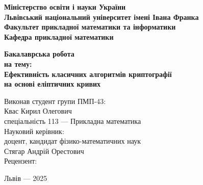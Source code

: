 \documentclass[12pt]{report}
\theoremstyle{definition}
\theoremstyle{plain}
\begin{document}
\begin{titlepage}
    \begin{center}
        \large 
        \textbf{Міністерство освіти і науки України}\\
        \textbf{Львівський національний університет імені Івана Франка}\\
        \vspace{0.5cm}
        \textbf{Факультет прикладної математики та інформатики}\\
        \textbf{Кафедра прикладної математики}\\
        
        \vfill
        
        \Large 
        \textbf{Бакалаврська робота}\\
        \vspace{0.3cm}
        \normalsize 
        \textbf{на тему:}\\
        \vspace{0.3cm}
        \Large 
        \textbf{Ефективність класичних алгоритмів криптографії \\ на основі еліптичних кривих}\\
        
        \vfill
        
        \begin{flushright}
            \normalsize 
            Виконав студент групи ПМП-43:\\
            Квас Кирил Олегович\\
            спеціальність 113 — Прикладна математика\\
            \vspace{1cm}
            Науковий керівник:\\
            доцент, кандидат фізико-математичних наук\\
            Стягар Андрій Орестович \\
            \vspace{1cm}
            Рецензент:\\
            \vspace{0.5cm}
            \underline{\hspace{7cm}}
        \end{flushright}
        
        \vfill
        
        \normalsize 
        Львів — 2025
    \end{center}
\end{titlepage}
\end{document}
